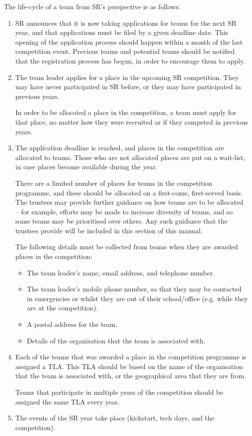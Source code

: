 The life-cycle of a team from SR's perspective is as follows:
\begin{enumerate}

\item SR announces that it is now taking applications for teams for the next SR year, and that applications must be filed by a given deadline date.  This opening of the application process should happen within a month of the last competition event.  Previous teams and potential teams should be notified that the registration process has begun, in order to encourage them to apply.

\item The team leader applies for a place in the upcoming SR competition.  They may have never participated in SR before, or they may have participated in previous years.

  In order to be allocated a place in the competition, a team must apply for that place, no matter how they were recruited or if they competed in previous years.

\item The application deadline is reached, and places in the competition are allocated to teams.  Those who are not allocated places are put on a wait-list, in case places become available during the year.

There are a limited number of places for teams in the competition programme, and these should be allocated on a first-come, first-served basis.  The trustees may provide further guidance on how teams are to be allocated -- for example, efforts may be made to increase diversity of teams, and so some teams may be prioritised over others.  Any such guidance that the trustees provide will be included in this section of this manual.

The following details must be collected from teams when they are awarded places in the competition:
\begin{itemize}
\item The team leader's name, email address, and telephone number.
\item The team leader's mobile phone number, so that they may be contacted in emergencies or whilst they are out of their school/office (e.g. while they are at the competition).
\item A postal address for the team.
\item Details of the organisation that the team is associated with.
\end{itemize}

\item Each of the teams that was awarded a place in the competition programme is assigned a TLA.  This TLA should be based on the name of the organisation that the team is associated with, or the geographical area that they are from.

  Teams that participate in multiple years of the competition should be assigned the same TLA every year.

\item The events of the SR year take place (kickstart, tech days, and the competition).
\end{enumerate}


